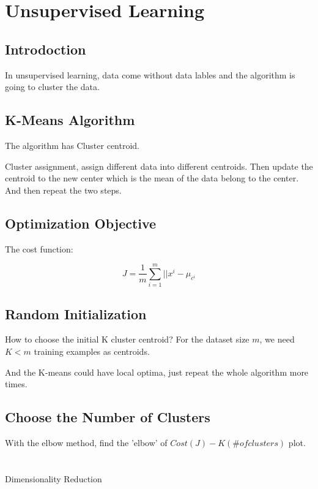 \documentclass[en,11pt,english,black,simple]{../elegantbook}
\begin{document}
\fi 
\def\chapname{08unsupervised}

\chapter{Unsupervised Learning}

\section{Introdoction}

In unsupervised learning, data come without data lables and the algorithm is going to cluster the data. 

\section{K-Means Algorithm}

The algorithm has Cluster centroid. 

Cluster assignment, assign different data into different centroids. Then update the centroid to the new center which is the mean of the data belong to the center. And then repeat the two steps.  

\section{Optimization Objective}

The cost function: 

\[J = \frac{1}{m} \sum_{i=1}^m ||x^{i} - \mu _{c^i}\]

\section{Random Initialization}

How to choose the initial K cluster centroid? For the dataset size \(m\), we need \(K < m\) training examples as centroids. 

And the K-means could have local optima, just repeat the whole algorithm more times. 

\section{Choose the Number of Clusters}

With the elbow method, find the 'elbow' of \(Cost(J)-K(\# of clusters)\) plot.

\chapter{}{Dimensionality Reduction}
\end{document}
